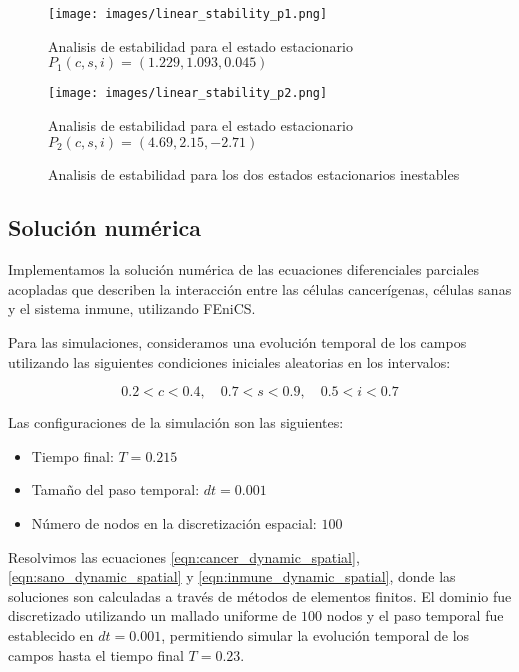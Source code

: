 \documentclass{article}
\begin{document}
\begin{figure}[htbp]
    \centering
    \begin{minipage}[b]{0.45\textwidth}
        \centering
        \texttt{[image: images/linear\_stability\_p1.png]}
        \caption{Analisis de estabilidad para el estado estacionario $P_1(c,s,i) =  (1.229,1.093,0.045)$}
        \label{fig:imagen1}
    \end{minipage}
    \hfill
    \begin{minipage}[b]{0.45\textwidth}
        \centering
        \texttt{[image: images/linear\_stability\_p2.png]}
        \caption{Analisis de estabilidad para el estado estacionario $P_2(c,s,i) = (4.69, 2.15, -2.71)$}
        \label{fig:imagen2}
    \end{minipage}
    \caption{Analisis de estabilidad para los dos estados estacionarios inestables}
    \label{fig:imagen_estabilidad}
\end{figure}


\subsection{Solución numérica}

Implementamos la solución numérica de las ecuaciones diferenciales parciales acopladas que describen la interacción entre las células cancerígenas, células sanas y el sistema inmune, utilizando FEniCS. 

Para las simulaciones, consideramos una evolución temporal de los campos utilizando las siguientes condiciones iniciales aleatorias en los intervalos:

\[
0.2 < c < 0.4, \quad 0.7 < s < 0.9, \quad 0.5 < i < 0.7
\]

Las configuraciones de la simulación son las siguientes:

\begin{itemize}
    \item Tiempo final: $T = 0.215$
    \item Tamaño del paso temporal: $dt = 0.001$
    \item Número de nodos en la discretización espacial: $100$
\end{itemize}

Resolvimos las ecuaciones \ref{eqn:cancer_dynamic_spatial}, \ref{eqn:sano_dynamic_spatial} y \ref{eqn:inmune_dynamic_spatial}, donde las soluciones son calculadas a través de métodos de elementos finitos. El dominio fue discretizado utilizando un mallado uniforme de $100$ nodos y el paso temporal fue establecido en $dt = 0.001$, permitiendo simular la evolución temporal de los campos hasta el tiempo final $T = 0.23$.
\end{document}
